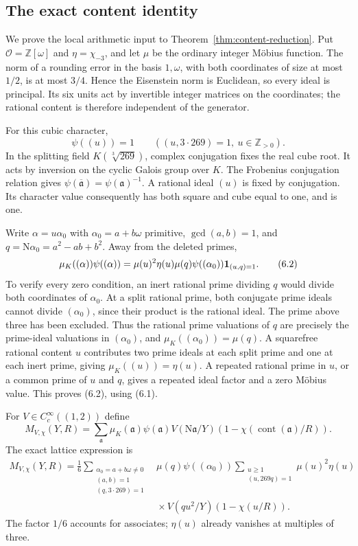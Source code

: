 \documentclass[11pt]{article}
\newcommand{\N}{\mathrm N}
\begin{document}
\subsection{The exact content identity}

We prove the local arithmetic input to
Theorem~\ref{thm:content-reduction}. Put
$\mathcal O=\mathbb Z[\omega]$ and $\eta=\chi_{-3}$,
and let $\mu$ be the ordinary integer M\"obius function.
The norm of a rounding error in the basis $1,\omega$, with
both coordinates of size at most $1/2$, is at most $3/4$.
Hence the Eisenstein norm is Euclidean, so every ideal is
principal. Its six units act by invertible integer matrices
on the coordinates; the rational content is therefore
independent of the generator.

For this cubic character,
\[
                        \psi((u))=1
        \qquad ((u,3\cdot269)=1,\ u\in\mathbb Z_{>0}).     \tag{6.1}
\]
In the splitting field $K(\sqrt[3]{269})$, complex conjugation
fixes the real cube root. It acts by inversion on the cyclic
Galois group over $K$.
The Frobenius conjugation relation gives
$\psi(\overline{\mathfrak a})=\psi(\mathfrak a)^{-1}$.
A rational ideal $(u)$ is fixed by conjugation.
Its character value consequently has both square and cube
equal to one, and is one.

Write $\alpha=u\alpha_0$ with
$\alpha_0=a+b\omega$ primitive, $\gcd(a,b)=1$, and
$q=\N\alpha_0=a^2-ab+b^2$. Away from the deleted primes,
\[
 \mu_K((\alpha))\psi((\alpha))
 =\mu(u)^2\eta(u)\mu(q)\psi((\alpha_0))
                       {\bf1}_{(u,q)=1}.                 \tag{6.2}
\]
To verify every zero condition, an inert rational prime dividing
$q$ would divide both coordinates of $\alpha_0$.
At a split rational prime, both conjugate prime ideals cannot
divide $(\alpha_0)$, since their product is the rational ideal.
The prime above three has been excluded. Thus the rational
prime valuations of $q$ are precisely the prime-ideal
valuations in $(\alpha_0)$, and
$\mu_K((\alpha_0))=\mu(q)$.
A squarefree rational content $u$ contributes two prime ideals
at each split prime and one at each inert prime, giving
$\mu_K((u))=\eta(u)$. A repeated rational prime in $u$,
or a common prime of $u$ and $q$, gives a repeated ideal factor
and a zero M\"obius value. This proves (6.2), using (6.1).

For $V\in C_c^\infty((1,2))$ define
\[
 M_{V,\chi}(Y,R)=\sum_{\mathfrak a}
   \mu_K(\mathfrak a)\psi(\mathfrak a)V(\N\mathfrak a/Y)
       (1-\chi(\operatorname{cont}(\mathfrak a)/R)).
\]
The exact lattice expression is
\begin{align*}
 M_{V,\chi}(Y,R)=\frac16
 \sum_{\substack{\alpha_0=a+b\omega\ne0\\(a,b)=1\\
                         (q,3\cdot269)=1}}
 &\mu(q)\psi((\alpha_0))
 \sum_{\substack{u\ge1\\(u,269q)=1}}\mu(u)^2\eta(u)\\
 &{}\times V(qu^2/Y)(1-\chi(u/R)).
\end{align*}
The factor $1/6$ accounts for associates; $\eta(u)$ already
vanishes at multiples of three.
\end{document}
